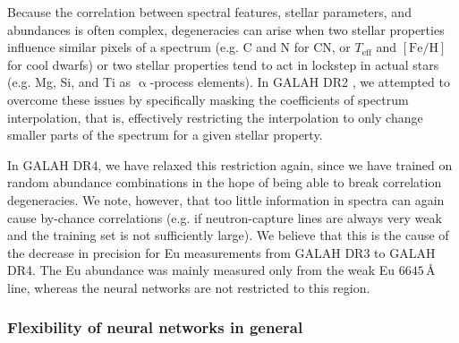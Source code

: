 \documentclass[
  journal=pasa,
  manuscript=research-paper, %
  year=2024,
  volume=37
]{cup-journal}
\newcommand{\Teff}{$T_\mathrm{eff}$\xspace}
\newcommand{\feh}{$\mathrm{[Fe/H]}$\xspace}
\begin{document}
Because the correlation between spectral features, stellar parameters, and abundances is often complex, degeneracies can arise when two stellar properties influence similar pixels of a spectrum (e.g. C and N for CN, or \Teff and \feh for cool dwarfs) or two stellar properties tend to act in lockstep in actual stars (e.g. Mg, Si, and Ti as $\upalpha$-process elements). In GALAH DR2 \citep{Buder2018}, we attempted to overcome these issues by specifically masking the coefficients of spectrum interpolation, that is, effectively restricting the interpolation to only change smaller parts of the spectrum for a given stellar property.

In GALAH DR4, we have relaxed this restriction again, since we have trained on random abundance combinations in the hope of being able to break correlation degeneracies. We note, however, that too little information in spectra can again cause by-chance correlations (e.g. if neutron-capture lines are always very weak and the training set is not sufficiently large). We believe that this is the cause of the decrease in precision for Eu measurements from GALAH DR3 to GALAH DR4. The Eu abundance was mainly measured only from the weak Eu $6645\,\text{\AA}$ line, whereas the neural networks are not restricted to this region.

\subsubsection{Flexibility of neural networks in general}
\end{document}
